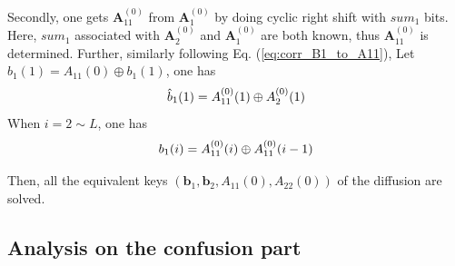 \documentclass[final,3p,times]{elsarticle}
\begin{document}
Secondly, one gets $\bm{A}_{11}^{(0)}$ from $\bm{A}_{1}^{(0)}$ by doing cyclic right shift with $sum_1$ bits. Here, $sum_1$ associated with $\bm{A}_{2}^{(0)}$ and $\bm{A}_{1}^{(0)}$ are both known, thus $\bm{A}_{11}^{(0)}$ is determined. Further, similarly following Eq. (\ref{eq:corr_B1_to_A11}), 
Let $\hat{b}_{1}(1)=A_{11}(0) \oplus b_{1}(1)$, one has
\begin{equation*}
\hat{b}_{1}(1)=A_{11}^{(0)}(1) \oplus A_{2}^{(0)}(1) \\
\end{equation*}
When $i=2 \sim L$, one has
\begin{equation*}
b_{1}(i) = A_{11}^{(0)}(i) \oplus  A_{11}^{(0)}(i-1) \\
\end{equation*}

Then, all the equivalent keys $(\bm{b}_1,\bm{b}_2,A_{11}(0),A_{22}(0))$ of the diffusion are solved.

\subsection{Analysis on the confusion part}
\end{document}
